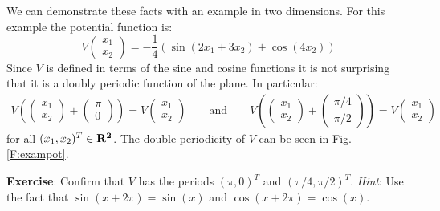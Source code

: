    We can demonstrate these facts with an example in two dimensions.  For
this example the potential function is:
\begin{equation}\label{E:exampot}
   V
\begin{pmatrix}
x_1 \\ x_2 
\end{pmatrix}
= -\frac{1}{4} \left( \sin(2 x_1 + 3 x_2) + \cos(4 x_2) \right)
\end{equation}
Since $V$ is defined in terms of the sine and cosine functions it is not 
surprising that it is a doubly periodic function of the plane.  In particular:
\begin{eqnarray*}
   V \left(
\begin{pmatrix}
x_1 \\ x_2
\end{pmatrix}
+
\begin{pmatrix}
\pi \\ 0
\end{pmatrix} \right)
= V
\begin{pmatrix}
x_1\\ x_2
\end{pmatrix} 
\qquad \mathrm{and} \qquad 
   V \left(
\begin{pmatrix}
x_1 \\ x_2 
\end{pmatrix}
+
\begin{pmatrix}
\pi/4 \\ \pi/2
\end{pmatrix} \right)
= V
\begin{pmatrix}
x_1\\ x_2
\end{pmatrix}
\end{eqnarray*}
for all $(x_1, x_2)^T \in \bf{R}^2$.  The double periodicity of $V$ can be seen
in Fig. \ref{F:exampot}.

\bigskip

\noindent
{\bf Exercise}: Confirm that $V$ has the periods $(\pi,0)^T$ and $(\pi/4, 
\pi/2)^T$.  \emph{Hint}: Use the fact that $\sin(x+2\pi)=\sin(x)$ and 
$\cos(x+2\pi) = \cos(x)$.

\bigskip

